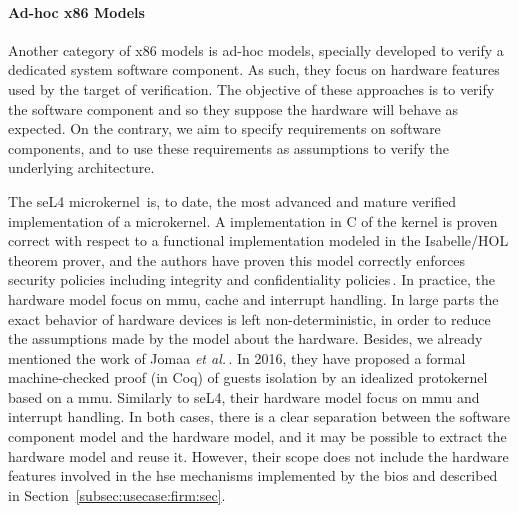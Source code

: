 \paragraph{Ad-hoc x86 Models}
%
Another category of x86 models is ad-hoc models, specially developed to verify a
dedicated system software component.
%
As such, they focus on hardware features used by the target of verification.
%
The objective of these approaches is to verify the software component and so
they suppose the hardware will behave as expected.
%
On the contrary, we aim to specify requirements on software components, and to
use these requirements as assumptions to verify the underlying architecture.

The seL4 microkernel\,\cite{sel4website} is, to date, the most advanced and
mature verified implementation of a microkernel.
%
A implementation in C of the kernel is proven correct with respect to a
functional implementation modeled in the Isabelle/HOL theorem prover, and the
authors have proven this model correctly enforces security policies including
integrity and confidentiality policies\,\cite{klein2009sel4}.
%
In practice, the hardware model focus on \ac{mmu}, cache and interrupt handling.
In large parts the exact behavior of hardware devices is left non-deterministic,
in order to reduce the assumptions made by the model about the hardware.
%
Besides, we already mentioned the work of Jomaa \emph{et
  al.}\,\cite{jomaa2016mmu}.
%
In 2016, they have proposed a formal machine-checked proof (in Coq) of guests
isolation by an idealized protokernel based on a \ac{mmu}.
%
Similarly to seL4, their hardware model focus on \ac{mmu} and interrupt
handling.
%
In both cases, there is a clear separation between the software component model
and the hardware model, and it may be possible to extract the hardware model and
reuse it.
%
However, their scope does not include the hardware features involved in the
\ac{hse} mechanisms implemented by the \ac{bios} and described in
Section~\ref{subsec:usecase:firm:sec}.

